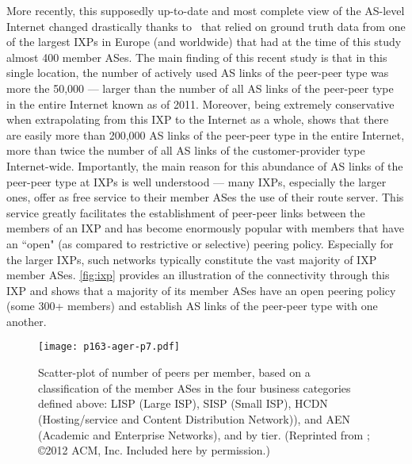 More recently, this supposedly up-to-date and most complete view of
the AS-level Internet changed drastically thanks
to~\cite{ager12:_anatom_europ_ixp} that relied on ground truth data
from one of the largest IXPs in Europe (and worldwide) that had at the
time of this study almost 400 member ASes. The main finding of this
recent study is that in this single location, the number of actively
used AS links of the peer-peer type was more the 50,000 --- larger
than the number of all AS links of the peer-peer type in the entire
Internet known as of 2011. Moreover, being extremely conservative when
extrapolating from this IXP to the Internet as a whole,
\cite{ager12:_anatom_europ_ixp} shows that there are easily more than
200,000 AS links of the peer-peer type in the entire Internet, more
than twice the number of all AS links of the customer-provider type
Internet-wide.  Importantly, the main reason for this abundance of AS
links of the peer-peer type at IXPs is well understood --- many IXPs,
especially the larger ones, offer as free service to their member ASes
the use of their route server. This service greatly facilitates the
establishment of peer-peer links between the members of an IXP and has
become enormously popular with members that have an ``open" (as
compared to restrictive or selective) peering policy. Especially for
the larger IXPs, such networks typically constitute the vast majority
of IXP member ASes. \autoref{fig:ixp} provides an illustration of the
connectivity through this IXP and shows that a majority of its member
ASes have an open peering policy (some 300+ members) and establish AS
links of the peer-peer type with one another.

\begin{figure}[thbp] 
  \begin{center}
    \texttt{[image: p163-ager-p7.pdf]}
    \caption{Scatter-plot of number of peers per member, based on a
      classification of the member ASes in the four business
      categories defined above: LISP (Large ISP), SISP (Small ISP),
      HCDN (Hosting/service and Content Distribution Network)), and
      AEN (Academic and Enterprise Networks), and by tier.  
      (Reprinted from \cite{ager12:_anatom_europ_ixp}; \copyright 2012 ACM, Inc. Included here by permission.)
      \label{fig:ixp}}
  \end{center}
\end{figure}         

